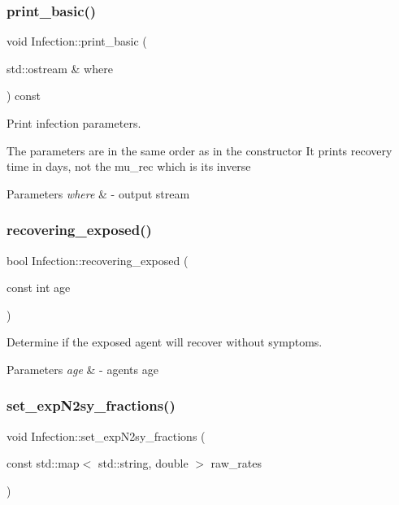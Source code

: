 \subsubsection{\texorpdfstring{print\+\_\+basic()}{print\_basic()}}
{\footnotesize\ttfamily void Infection\+::print\+\_\+basic (\begin{DoxyParamCaption}\item[{std\+::ostream \&}]{where }\end{DoxyParamCaption}) const}



Print infection parameters. 

The parameters are in the same order as in the constructor It prints recovery time in days, not the mu\+\_\+rec which is its\textquotesingle{} inverse 
\begin{DoxyParams}{Parameters}
{\em where} & -\/ output stream \\
\hline
\end{DoxyParams}
\mbox{\label{classInfection_a5600af48af334712c2d18cc7fadfe4a5}} 
\subsubsection{\texorpdfstring{recovering\+\_\+exposed()}{recovering\_exposed()}}
{\footnotesize\ttfamily bool Infection\+::recovering\+\_\+exposed (\begin{DoxyParamCaption}\item[{const int}]{age }\end{DoxyParamCaption})}



Determine if the exposed agent will recover without symptoms. 


\begin{DoxyParams}{Parameters}
{\em age} & -\/ agent\textquotesingle{}s age \\
\hline
\end{DoxyParams}
\mbox{\label{classInfection_a34eefa18fbef918bca0077814ae76077}} 
\subsubsection{\texorpdfstring{set\+\_\+exp\+N2sy\+\_\+fractions()}{set\_expN2sy\_fractions()}}
{\footnotesize\ttfamily void Infection\+::set\+\_\+exp\+N2sy\+\_\+fractions (\begin{DoxyParamCaption}\item[{const std\+::map$<$ std\+::string, double $>$}]{raw\+\_\+rates }\end{DoxyParamCaption})}



